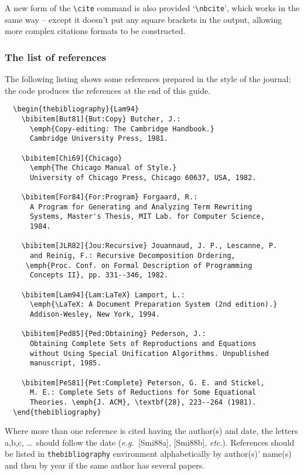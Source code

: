 \documentclass{fac}
\newcommand\eg{\textit{e.g.\ }}
\newcommand\etc{\textit{etc}}
\begin{document}
A new form of the \verb"\cite" command is also provided `\verb"\nbcite"',
which works in the same way -- except it doesn't put any square brackets
in the output, allowing more complex citations formats to be constructed.

\subsubsection{The list of references}

The following listing shows some references prepared in the style of the
journal; the code produces the references at the end of this guide.
%
\begin{verbatim}
  \begin{thebibliography}{Lam94}
    \bibitem[But81]{But:Copy} Butcher, J.:
      \emph{Copy-editing: The Cambridge Handbook.}
      Cambridge University Press, 1981.

    \bibitem[Chi69]{Chicago}
      \emph{The Chicago Manual of Style.}
      University of Chicago Press, Chicago 60637, USA, 1982.

    \bibitem[For84]{For:Program} Forgaard, R.:
      A Program for Generating and Analyzing Term Rewriting
      Systems, Master's Thesis, MIT Lab. for Computer Science,
      1984.

    \bibitem[JLR82]{Jou:Recursive} Jouannaud, J. P., Lescanne, P.
      and Reinig, F.: Recursive Decomposition Ordering,
     \emph{Proc. Conf. on Formal Description of Programming
      Concepts II}, pp. 331--346, 1982.

    \bibitem[Lam94]{Lam:LaTeX} Lamport, L.:
      \emph{\LaTeX: A Document Preparation System (2nd edition).}
      Addison-Wesley, New York, 1994.

    \bibitem[Ped85]{Ped:Obtaining} Pederson, J.:
      Obtaining Complete Sets of Reproductions and Equations
      without Using Special Unification Algorithms. Unpublished
      manuscript, 1985.

    \bibitem[PeS81]{Pet:Complete} Peterson, G. E. and Stickel,
      M. E.: Complete Sets of Reductions for Some Equational
      Theories. \emph{J. ACM}, \textbf{28}, 223--264 (1981).
  \end{thebibliography}
\end{verbatim}
%
Where more than one reference is cited having the author(s) and date, the
letters a,b,c, \ldots\ should follow the date (\eg [Smi88a], [Smi88b],
\etc.). References should be listed in \verb"thebibliography" environment
alphabetically by author(s)' name(s) and then by year if the same author
has several papers.
\end{document}
